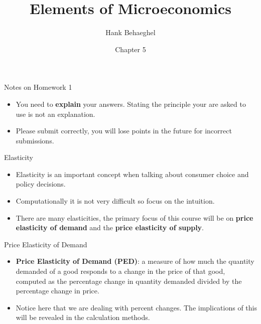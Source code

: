 \documentclass[aspectratio=169]{beamer}
\title{Elements of Microeconomics}
\author{Hank Behaeghel}
\institute{Johns Hopkins University}
\date{Chapter 5}
\begin{document}
\maketitle

\begin{frame}{Notes on Homework 1}

    \begin{itemize}
        \item You need to \textbf{explain} your answers. Stating the principle your are asked to use is not an explanation.
        \item Please submit correctly, you will lose points in the future for incorrect submissions.
    \end{itemize}
    
\end{frame}


\begin{frame}{Elasticity}
    \begin{itemize}
        \item Elasticity is an important concept when talking about consumer choice and policy decisions.
        \item Computationally it is not very difficult so focus on the intuition.
        \item There are many elasticities, the primary focus of this course will be on \textbf{price elasticity of demand} and the \textbf{price elasticity of supply}.
    \end{itemize}
\end{frame}

\begin{frame}{Price Elasticity of Demand}
    \begin{itemize}
        \item<1-> \textbf{Price Elasticity of Demand (PED)}: a measure of how much the quantity demanded of a good responds to a change in the price of
        that good, computed as the percentage change in quantity demanded
        divided by the percentage change in price.
        \vspace{5mm}
        \item Notice here that we are dealing with percent changes. The implications of this will be revealed in the calculation methods.
    \end{itemize}
\end{frame}
\end{document}
